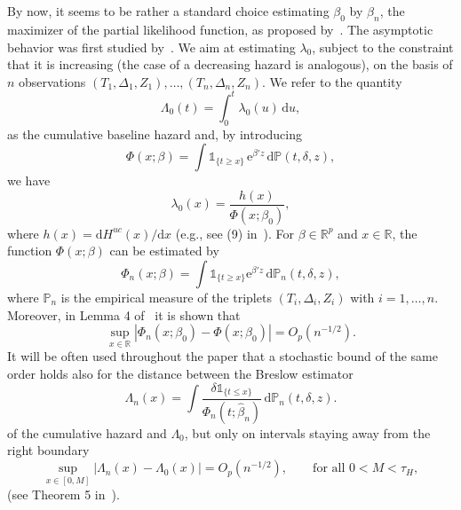\documentclass[11pt,reqno]{amsart}
\theoremstyle{definition}
\theoremstyle{plain}
\theoremstyle{remark}
\begin{document}
By now, it seems to be rather a standard choice estimating $\beta_0$ by $\hat{\beta}_n$, the maximizer of the partial likelihood function, as proposed by~\cite{Cox72}.
The asymptotic behavior was first studied by~\cite{Tsiatis81}.
We aim at estimating $\lambda_0$, subject to the constraint that it is increasing (the case of a decreasing hazard is analogous), on the basis of $n$ observations $(T_1,\Delta_1,Z_1),\dots,(T_n,\Delta_n,Z_n)$.  We  refer to the quantity
\[
\Lambda_0(t)=\int_0^t\lambda_0(u)\,\mathrm{d}u,
\]
as the cumulative baseline hazard and, by introducing
\begin{equation}
\label{eq:def Phi}
\Phi(x;\beta)=\int {\mathds{1}}_{ \{t\geq x\}}\,\mathrm{e}^{\beta'z}\,\mathrm{d}{\mathbb{P}}(t,\delta,z),
\end{equation}
we have
\begin{equation}
\label{eqn:lambda0}
\lambda_0(x)
=
\frac{h(x)}{\Phi(x;\beta_0)},
\end{equation}
where $h(x)=\mathrm{d}H^{uc}(x)/\mathrm{d}x$
(e.g., see (9) in~\cite{LopuhaaNane2013}).
For $\beta\in{\mathbb{R}}^p$ and $x\in{\mathbb{R}}$, the function $\Phi(x;\beta)$ can be estimated by
\begin{equation}
\label{eq:def Phin}
\Phi_n(x;\beta)=\int {\mathds{1}}_{\{t\geq x\}} \mathrm{e}^{\beta'z}\,\mathrm{d}{\mathbb{P}}_n(t,\delta,z),
\end{equation}
where ${\mathbb{P}}_n$ is the empirical measure of the triplets $(T_i,\Delta_i,Z_i)$ with $i=1,\dots,n.$  Moreover, in Lemma 4 of~\cite{LopuhaaNane2013} it is shown that
\begin{equation}
\label{eqn:Phi}
\sup_{x\in{\mathbb{R}}}|\Phi_n(x;\beta_0)-\Phi(x;\beta_0)|=O_p(n^{-1/2}).
\end{equation}
It will be often used throughout the paper that a stochastic bound of the same order holds also for the distance between the Breslow estimator
\begin{equation}
\label{eq:Breslow}
\Lambda_n(x)=\int \frac{\delta{\mathds{1}}_{\{ t\leq x\}}}{\Phi_n(t;\hat{\beta}_n)}\,\mathrm{d}{\mathbb{P}}_n(t,\delta,z).
\end{equation}
of the cumulative hazard and $\Lambda_0$, but only on intervals staying away from the right boundary
\begin{equation}
\label{eqn:Breslow}
\sup_{x\in[0,M]}|\Lambda_n(x)-\Lambda_0(x)|=O_p(n^{-1/2}), \qquad\text{for all }0<M<\tau_H,
\end{equation}
(see Theorem 5 in~\cite{LopuhaaNane2013}).
\end{document}
